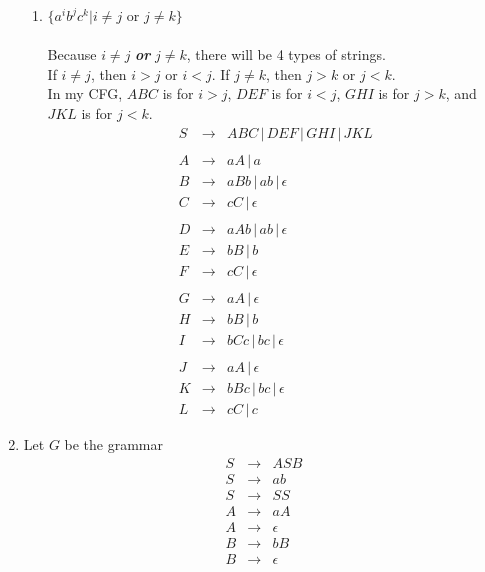 \documentclass[10pt,a4paper,final]{article}
\begin{document}
\begin{enumerate}
\begin{enumerate}
  \item %
  $\{a^i b^j c^k | i \neq j$ or $j \neq k\}$ \\
  \\
  Because $i \neq j$ \textbf{\emph{or}} $j \neq k$, there will be 4 types of strings. \\
  If $i \neq j$, then $i > j$ or $i < j$.
  If $j \neq k$, then $j > k$ or $j < k$.\\
  In my CFG, $ABC$ is for $i > j$, $DEF$ is for $i < j$, $GHI$ is for $j > k$, and
  $JKL$ is for $j < k$.
  \begin{eqnarray*}
  S &\rightarrow& ABC \,|\, DEF \,|\, GHI \,|\, JKL \\
  \\
  A &\rightarrow& aA \,|\, a \\
  B &\rightarrow& aBb \,|\, ab \,|\, \epsilon \\
  C &\rightarrow& cC \,|\, \epsilon \\
  \\
  D &\rightarrow& aAb \,|\, ab \,|\, \epsilon \\
  E &\rightarrow& bB \,|\, b \\
  F &\rightarrow& cC \,|\, \epsilon \\
  \\
  G &\rightarrow& aA \,|\, \epsilon \\
  H &\rightarrow& bB \,|\, b \\
  I &\rightarrow& bCc \,|\, bc \,|\, \epsilon \\
  \\
  J &\rightarrow& aA \,|\, \epsilon \\
  K &\rightarrow& bBc \,|\, bc \,|\, \epsilon \\
  L &\rightarrow& cC \,|\, c
  \end{eqnarray*}
\end{enumerate}

\item %
Let $G$ be the grammar
\begin{eqnarray}
  S &\rightarrow& ASB \\
  S &\rightarrow& ab \\
  S &\rightarrow& SS \\
  A &\rightarrow& aA \\
  A &\rightarrow& \epsilon \\
  B &\rightarrow& bB \\
  B &\rightarrow& \epsilon
\end{eqnarray}


\end{enumerate}
\end{document}
